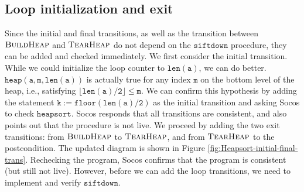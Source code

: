 \documentclass[english,submission]{eptcs}
\begin{document}
\subsection{Loop initialization and exit}

Since the initial and final transitions, as well as the transition
between $\textsc{BuildHeap}$ and $\textsc{TearHeap}$ do not depend on
the $\texttt{siftdown}$ procedure, they can be added and checked
immediately. We first consider the initial transition. While we could
initialize the loop counter to $\mathtt{len(a)}$, we can do better.
$\mathtt{heap(a,m,len(a))}$ is actually true for any index
$\mathtt{m}$ on the bottom level of the heap, i.e., satisfying
$\mathtt{\lfloor len(a)/2\rfloor\le m}$.  We can confirm this
hypothesis by adding the statement $\mathtt{k:=floor(len(a)/2)}$ as
the initial transition and asking Socos to check
$\mathtt{heapsort}$. Socos responds that all transitions are
consistent, and also points out that the procedure is not live. We
proceed by adding the two exit transitions: from $\textsc{BuildHeap}$
to $\textsc{TearHeap}$, and from $\textsc{TearHeap}$ to the
postcondition.  The updated diagram is shown in Figure
\ref{fig:Heapsort-initial-final-trans}.  Rechecking the program, Socos
confirms that the program is consistent (but still not live). However,
before we can add the loop transitions, we need to implement and
verify $\texttt{siftdown}$.
\end{document}
